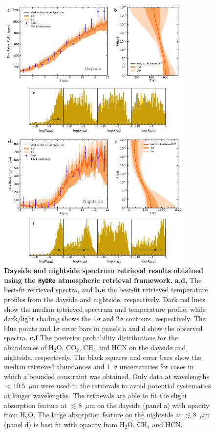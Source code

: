 \documentclass[pdflatex,sn-standardnature]{sn-jnl}%
\begin{document}
\begin{figure}
    \centering
    \includegraphics[width=0.86\textwidth]{GJ1214b_retreivals.png}
    \caption{{\bf Dayside and nightside spectrum retrieval results obtained using the \texttt{HyDRo} atmospheric retrieval framework.} \textbf{a,d,} The best-fit retrieved spectra, and \textbf{b,e} the best-fit retrieved temperature profiles from the dayside and nightside, respectively. Dark red lines show the median retrieved spectrum and temperature profile, while dark/light shading shows the 1$\sigma$ and 2$\sigma$ contours, respectively. The blue points and 1$\sigma$ error bars in panels a and d show the observed spectra. {\bf c,f} The posterior probability distributions for the abundances of H$_2$O, CO$_2$, CH$_4$ and HCN on the dayside and nightside, respectively. The black squares and error bars show the median retrieved abundances and 1~$\sigma$ uncertainties for cases in which a bounded constraint was obtained. Only data at wavelengths $<10.5$~$\mu$m were used in the retrievals to avoid potential systematics at longer wavelengths. The retrievals are able to fit the slight absorption feature at $\lesssim 8$~$\mu$m on the dayside (panel a) with opacity from H$_2$O. The large absorption feature on the nightside at $\lesssim 8$~$\mu$m (panel d) is best fit with opacity from H$_2$O, CH$_4$ and HCN.}
    \label{fig:retrievals}
\end{figure}
\end{document}
